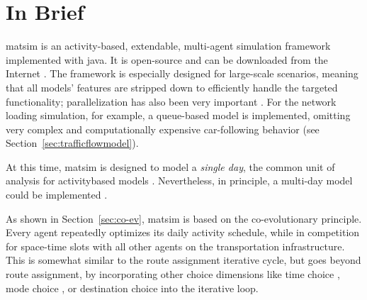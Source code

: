 \section{In Brief}
\label{sec:inbrief}
\gls{matsim} is an activity-based, extendable, multi-agent simulation \gls{framework} 
implemented with 
\gls{java}. It is open-source and can be downloaded from the Internet \citep[][]{MATSIM_Webpage_2015, GitHub_Webpage_2015}. The \gls{framework} is especially designed for large-scale scenarios, meaning that all models' features are stripped down to efficiently handle the targeted functionality; parallelization has also been very important \citep[e.g.,][]{Dobler_TechRep_IVT_2011, Charypar_PhDThesis_2008}. For the network loading simulation, for example, a queue-based model is implemented, omitting very complex and computationally expensive car-following behavior (see Section~\ref{sec:trafficflowmodel}).

At this time, \gls{matsim} is 
%
designed to model a \emph{single day}, the common unit of analysis for \gls{activitybased} models \citep[see, for example, the review by][]{Bowman_TEC_2009_1}. 
Nevertheless, in principle, a 
multi-day model could be implemented \citep[][]{HorniEtAl_TechRep_IVT_2012_a}.

As shown in Section~\ref{sec:co-ev}, \gls{matsim} is based on the co-evolutionary principle. Every agent repeatedly optimizes its daily \gls{activity} schedule, while in  competition for space-time slots with all other agents on the transportation infrastructure.  This is somewhat similar to the route assignment iterative cycle, but goes beyond route assignment, by incorporating other choice dimensions like time choice \citep{BalmerRaneyEtAl2005act-times}, mode choice \citep{GretherEtAl2009SimpleModeChoiceIPL}, or destination choice %
\citep{HorniEtAl2011TrbLocationChoice}
into the iterative loop.

